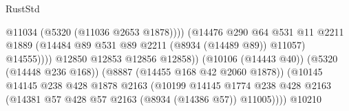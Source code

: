 \begin{lexlean}{RustStd}
\begin{coremodule}
                                                          @11034
                                                          (@5320 (@11036 @2653 @1878))))
                                                      (@14476
                                                        @290
                                                        @64
                                                        @531
                                                        @11
                                                        @2211
                                                        @1889
                                                        (@14484
                                                          @89
                                                          @531
                                                          @89
                                                          @2211
                                                          (@8934 (@14489 @89))
                                                          @11057)
                                                        @14555))))
                                                @12850
                                                @12853
                                                @12856
                                                @12858))
                                            (@10106 (@14443 @40))
                                            (@5320 (@14448 @236 @168))
                                            (@8887 (@14455 @168 @42 @2060 @1878))
                                            (@10145
                                              @14145
                                              @238
                                              @428
                                              @1878
                                              @2163
                                              (@10199
                                                @14145
                                                @1774
                                                @238
                                                @428
                                                @2163
                                                (@14381
                                                  @57
                                                  @428
                                                  @57
                                                  @2163
                                                  (@8934 (@14386 @57))
                                                  @11005))))
                                          @10210

\end{coremodule}
\end{lexlean}
